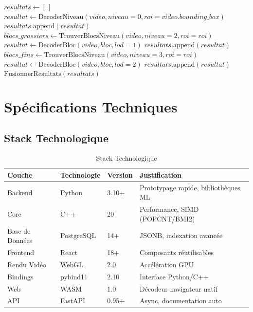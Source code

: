\documentclass[12pt,a4paper]{article}
\begin{document}
	\begin{algo}
		\label{algo:navigation_pyramidale}
		\begin{algorithmic}[1]
			\State $resultats \gets [\,]$
			\State $resultat \gets \text{DecoderNiveau}(video, niveau=0, roi=video.bounding\_box)$
			\State $resultats.\text{append}(resultat)$
			\EndIf
			\State $blocs\_grossiers \gets \text{TrouverBlocsNiveau}(video, niveau=2, roi=roi)$
			\State $resultat \gets \text{DecoderBloc}(video, bloc, lod=1)$
			\State $resultats.\text{append}(resultat)$
			\EndFor
			\EndIf
			\State $blocs\_fins \gets \text{TrouverBlocsNiveau}(video, niveau=3, roi=roi)$
			\State $resultat \gets \text{DecoderBloc}(video, bloc, lod=2)$
			\State $resultats.\text{append}(resultat)$
			\EndFor
			\EndIf
			\State \Return $\text{FusionnerResultats}(resultats)$
			\EndProcedure
		\end{algorithmic}
	\end{algo}
	
	\section{Spécifications Techniques}
	\label{sec:specs_techniques}
	
	\subsection{Stack Technologique}
	\label{subsec:stack_techno}
	
	\begin{table}[h]
		\centering
		\caption{Stack Technologique}
		\label{tab:stack_techno}
		\begin{tabular}{@{}llll@{}}
			\toprule
			\textbf{Couche} & \textbf{Technologie} & \textbf{Version} & \textbf{Justification} \\
			\midrule
			Backend & Python & 3.10+ & Prototypage rapide, bibliothèques ML \\
			Core & C++ & 20 & Performance, SIMD (POPCNT/BMI2) \\
			Base de Données & PostgreSQL & 14+ & JSONB, indexation avancée \\
			Frontend & React & 18+ & Composants réutilisables \\
			Rendu Vidéo & WebGL & 2.0 & Accélération GPU \\
			Bindings & pybind11 & 2.10 & Interface Python/C++ \\
			Web & WASM & 1.0 & Décodeur navigateur natif \\
			API & FastAPI & 0.95+ & Async, documentation auto \\
			\bottomrule
		\end{tabular}
	\end{table}
	
\end{document}
